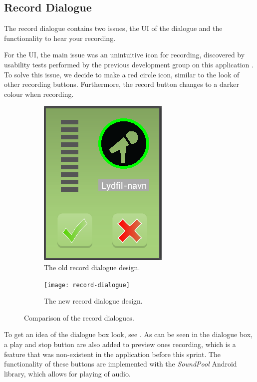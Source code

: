 \subsection{Record Dialogue}
The record dialogue contains two issues, the UI of the dialogue and the functionality to hear your recording.

For the UI, the main issue was an unintuitive icon for recording, discovered by usability tests performed by the previous development group on this application \citep{misc:crocold}. 
To solve this issue, we decide to make a red circle icon, similar to the look of other recording buttons. 
Furthermore, the record button changes to a darker colour when recording. 

\begin{figure}[h]
	\centering
	\begin{subfigure}[b]{0.45\textwidth}
		\centering
		\includegraphics[scale = 0.5]{media/CrocOldAudio}
		\caption{The old record dialogue design.}
		\label{figure:old-record-dialogue}
	\end{subfigure}
	\qquad
	\begin{subfigure}[b]{0.45\textwidth}
	     \centering
	     \texttt{[image: record-dialogue]}
	     \caption{The new record dialogue design.}
	     \label{fig:new-record-dialogue}
	\end{subfigure}
	\caption{Comparison of the record dialogues.}
	\label{figure:record-dialogue}
\end{figure}

To get an idea of the dialogue box look, see .
As can be seen in the dialogue box, a play and stop button are also added to preview ones recording, which is a feature that was non-existent in the application before this sprint.
The functionality of these buttons are implemented with the \textit{SoundPool} Android library, which allows for playing of audio.

